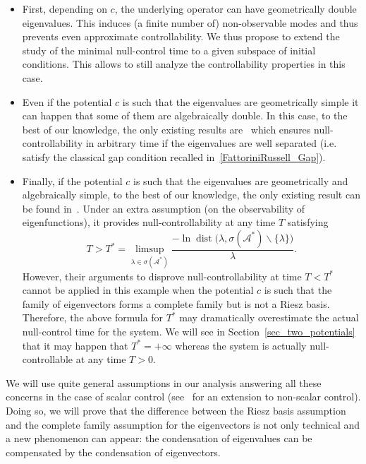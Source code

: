 \documentclass[AHL,Unicode,longabstracts]{cedram}
\newcommand\As{\mathcal{A}^*}
\DeclareMathOperator{\dist}{dist}
\begin{document}
\begin{itemize}
\item First, depending on $c$, the underlying operator can have geometrically double eigenvalues. This induces (a finite number of) non-observable modes and thus prevents even approximate controllability. We thus propose to extend the study of the minimal null-control time to a given subspace of initial conditions. This allows to still analyze the controllability properties in this case.
\item Even if the potential $c$ is such that the eigenvalues are geometrically simple it can happen that some of them are algebraically double. In this case, to the best of our knowledge, the only existing results are~\cite{AKBGBDT_Kalman,FCGBdT:2010} which ensures null-controllability in arbitrary time if the eigenvalues are well separated (i.e. satisfy the classical gap condition recalled in~\eqref{FattoriniRussell_Gap}).
\item Finally, if the potential $c$ is such that the eigenvalues are geometrically and algebraically simple, to the best of our knowledge, the only existing result can be found in~\cite{AmmarKhodjaBenabdallahGonzalez-BurgosdeTeresa:2014}. Under an extra assumption (on the observability of eigenfunctions), it provides null-controllability at any time $T$ satisfying
\[
T > T^* = \limsup_{ \lambda \in \sigma(\As)} \frac{ -\ln \dist\big(\lambda, \sigma(\As) \backslash \{ \lambda \} \big)}{\lambda}.
\]
However, their arguments to disprove null-controllability at time $T < T^*$ cannot be applied in this example when the potential $c$ is such that the family of eigenvectors forms a complete family but is not a Riesz basis. Therefore, the above formula for $T^*$ may dramatically overestimate the actual null-control time for the system. We will see in Section~\ref{sec_two_potentials} that it may happen that $T^*=+\infty$ whereas the system is actually null-controllable at any time $T>0$.
\end{itemize}

We will use quite general assumptions in our analysis answering all these concerns in the case of scalar control (see~\cite{BoyerMorancey} for an extension to non-scalar control). Doing so, we will prove that the difference between the Riesz basis assumption and the complete family assumption for the eigenvectors is not only technical and a new phenomenon can appear: the condensation of eigenvalues can be compensated by the condensation of eigenvectors.
\end{document}
